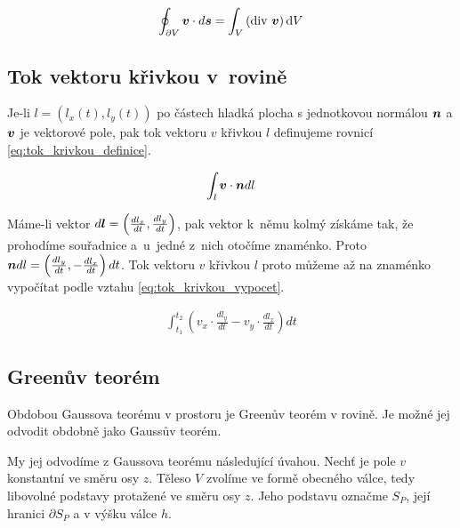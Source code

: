 \begin{equation}
\label{eq:gauss}
\oint_{\partial V} \vect{v} \cdot d\vect{s} = \int_V \left(\diverg \ \vect{v} \right) \mathrm{d}V
\end{equation}




\subsection{Tok vektoru křivkou v~rovině}

Je-li \(l = \left(l_x(t), l_y(t)\right)\) po částech hladká plocha s jednotkovou normálou \(\boldsymbol{n}\) a \(\boldsymbol{v}\) je vektorové pole,
pak tok vektoru \(v\) křivkou \(l\) definujeme rovnicí \eqref{eq:tok_krivkou_definice}.

\begin{equation}
\label{eq:tok_krivkou_definice}
\begin{split}
\int_l \boldsymbol{v} \cdot \boldsymbol{n} dl
\end{split}
\end{equation}

Máme-li vektor \(d \boldsymbol{l} = \left(\frac{d l_x}{dt}, \frac{d l_y}{dt}\right)\), pak vektor k~němu kolmý získáme tak, že prohodíme souřadnice a~u~jedné z~nich otočíme znaménko. Proto \(\boldsymbol{n} dl = \left(\frac{d l_y}{dt}, -\frac{d l_x}{dt}\right) dt\). Tok vektoru \(v\) křivkou \(l\) proto můžeme až na znaménko vypočítat podle vztahu \eqref{eq:tok_krivkou_vypocet}.

\begin{equation}
\label{eq:tok_krivkou_vypocet}
\begin{split}
\int_{t_1}^{t_2} \left (v_x \cdot \frac{d l_y}{dt} -v_y \cdot \frac{d l_x}{dt} \right) dt
\end{split}
\end{equation}

\subsection{Greenův teorém}

Obdobou Gaussova teorému v prostoru je Greenův teorém v rovině. Je možné jej odvodit obdobně jako Gaussův teorém.

My jej odvodíme z Gaussova teorému následující úvahou. Nechť je pole \(v\) konstantní ve směru osy \(z\). Těleso \(V\) zvolíme ve formě obecného válce, tedy libovolné podstavy protažené ve směru osy \(z\). Jeho podstavu označme \(S_P\), její hranici \(\partial S_P\) a v výšku válce \(h\).

